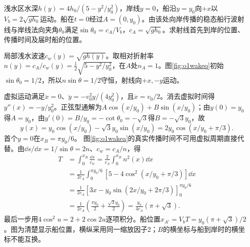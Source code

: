 \begin{example}\label{ex:o1wake}
浅水区水深$h(y)=4h_0/(5-y^2/y_0^2)$，岸线$y=0$，船沿$y=y_0$向$+x$以$V_b=2\sqrt{gh_0}$运动。船在$t=0$经过$A=(0,y_0)$。由该处向岸传播的稳态船行波射线与岸线法向夹角$\theta_0$满足$\sin\theta_0=c_A/V_b$，$c_A=\sqrt{gh_0}$。求射线首先到岸的位置、传播时间及届时船的位置。
\end{example}
\begin{solution}
局部浅水波速$c_w(y)=\sqrt{gh(y)}$。取相对折射率$n(y)=c_A/c_w(y)=\tfrac12\sqrt{5-y^2/y_0^2}$，在$A$处$n_A=1$。图\ref{fig:o1wakeq}初始$\sin\theta_0=1/2$，所以$n\sin\theta=1/2$守恒，射线向$+x,-y$运动。

虚拟运动满足$\ddot x=0$、$\ddot y=-v_0^2y/(4y_0^2)$，且$\dot x=v_0/2$。消去虚拟时间得$y''(x)=-y/y_0^2$。正弦型通解为$A\cos(x/y_0)+B\sin(x/y_0)$；由$y(0)=y_0$得$A=y_0$，由$y'(0)=B/y_0=-\cot\theta_0=-\sqrt3$得$B=-\sqrt3y_0$，故
\[
 y(x)=y_0\cos(x/y_0)-\sqrt3y_0\sin(x/y_0)
 =2y_0\cos(x/y_0+\pi/3).
\]
首个$y=0$在$x_B=\pi y_0/6$。
图\ref{fig:o1wakea}的真实传播时间不可用虚拟周期直接代替。由$\dd s/\dd x=1/\sin\theta=2n$、$c_w=c_A/n$，得
\begin{align*}
 T&=\int_0^{x_B}\frac{\dd s}{c_w}
 =\frac2{c_A}\int_0^{x_B}n^2(x)\dd x\\
 &=\frac1{2c_A}\int_0^{\pi y_0/6}
 [5-4\cos^2(x/y_0+\pi/3)]\dd x\\
 &=\frac1{2c_A}\left[3x-y_0\sin(2x/y_0+2\pi/3)\right]_0^{\pi y_0/6}\\
 &=\frac1{2c_A}\left(\frac{\pi y_0}{2}+\frac{\sqrt3y_0}{2}\right)
 =\frac{y_0}{4c_A}(\pi+\sqrt3).
\end{align*}
最后一步用$4\cos^2u=2+2\cos2u$逐项积分。船位置$x_{A'}=V_bT=y_0(\pi+\sqrt3)/2$。图为清楚显示船位置，横纵采用同一缩放因子2；$B$的横坐标与船到岸时的横坐标不能互换。
\end{solution}

